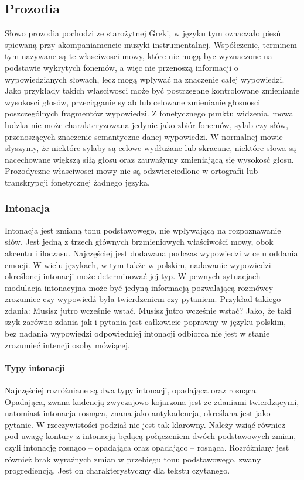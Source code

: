 \documentclass[a4paper,12 pt]{article}
\begin{document}
\subsection{Prozodia}
Słowo prozodia pochodzi ze starożytnej Greki, w języku tym oznaczało piesń spiewaną przy akompaniamencie muzyki instrumentalnej. Współczenie, terminem tym nazywane są te własciwosci mowy, które nie mogą byc wyznaczone na podstawie wykrytych fonemów, a więc nie przenoszą informacji o wypowiedzianych słowach, lecz mogą wpływać na znaczenie całej wypowiedzi. Jako przykłady takich własciwosci może być postrzegane kontrolowane zmienianie wysokosci głosów, przeciąganie sylab lub celowane zmienianie głosnosci poszczególnych fragmentów wypowiedzi.
Z fonetycznego punktu widzenia, mowa ludzka nie może charakteryzowana jedynie jako zbiór fonemów, sylab czy słów, przenoszących znaczenie semantyczne danej wypowiedzi. W normalnej mowie słyszymy, że niektóre sylaby są celowe wydłużane lub skracane, niektóre słowa są nacechowane większą siłą głosu oraz zauważymy zmieniającą się wysokosć głosu.
Prozodyczne własciwosci mowy nie są odzwierciedlone w ortografii lub transkrypcji fonetycznej żadnego języka.
\subsubsection{Intonacja}
Intonacja jest zmianą tonu podstawowego, nie wpływającą na rozpoznawanie słów. Jest jedną z trzech głównych brzmieniowych właściwości mowy, obok akcentu i iloczasu. Najczęściej jest dodawana podczas wypowiedzi w celu oddania emocji. W wielu językach, w tym także w polskim, nadawanie wypowiedzi określonej intonacji może determinować jej typ. W pewnych sytuacjach modulacja intonacyjna może być jedyną informacją pozwalającą rozmówcy zrozumiec czy wypowiedź była twierdzeniem czy pytaniem. 
Przykład takiego zdania:
\newline Musisz jutro wcześnie wstać.
\newline Musisz jutro wcześnie wstać?
\newline Jako, że taki szyk zarówno zdania jak i pytania jest całkowicie poprawny w języku polskim, bez nadania wypowiedzi odpowiedniej intonacji odbiorca nie jest w stanie zrozumieć intencji osoby mówiącej.

\paragraph{Typy intonacji}
Najczęściej rozróżniane są dwa typy intonacji, opadająca oraz rosnąca. Opadająca, zwana kadencją zwyczajowo kojarzona jest ze zdaniami twierdzącymi, natomiast intonacja rosnąca, znana jako antykadencja, określana jest jako pytanie. W rzeczywistości podział nie jest tak klarowny. Należy wziąć również pod uwagę kontury z intonacją będącą połączeniem dwóch podstawowych zmian, czyli intonację rosnąco – opadająca oraz opadająco – rosnąca. Rozróżniany jest również brak wyraźnych zmian w przebiegu tonu podstawowego, zwany progrediencją. Jest on charakterystyczny dla tekstu czytanego.
\end{document}
